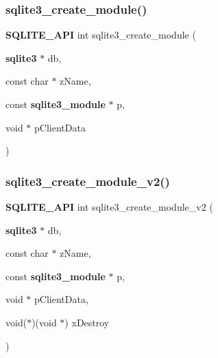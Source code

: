 \mbox{\label{sqlite3_8h_ac1c2da392b14a7bba8cc7605d56438d0}} 
\subsubsection{sqlite3\_create\_module()}
{\footnotesize\ttfamily \textbf{ S\+Q\+L\+I\+T\+E\+\_\+\+A\+PI} int sqlite3\+\_\+create\+\_\+module (\begin{DoxyParamCaption}\item[{\textbf{ sqlite3} $\ast$}]{db,  }\item[{const char $\ast$}]{z\+Name,  }\item[{const \textbf{ sqlite3\+\_\+module} $\ast$}]{p,  }\item[{void $\ast$}]{p\+Client\+Data }\end{DoxyParamCaption})}

\mbox{\label{sqlite3_8h_a293bb76c4e725c89ea93dde3ffa0c665}} 
\subsubsection{sqlite3\_create\_module\_v2()}
{\footnotesize\ttfamily \textbf{ S\+Q\+L\+I\+T\+E\+\_\+\+A\+PI} int sqlite3\+\_\+create\+\_\+module\+\_\+v2 (\begin{DoxyParamCaption}\item[{\textbf{ sqlite3} $\ast$}]{db,  }\item[{const char $\ast$}]{z\+Name,  }\item[{const \textbf{ sqlite3\+\_\+module} $\ast$}]{p,  }\item[{void $\ast$}]{p\+Client\+Data,  }\item[{void($\ast$)(void $\ast$)}]{x\+Destroy }\end{DoxyParamCaption})}

\mbox{\label{sqlite3_8h_a9286efead12c64bd30d4294a21e1f86e}} 
